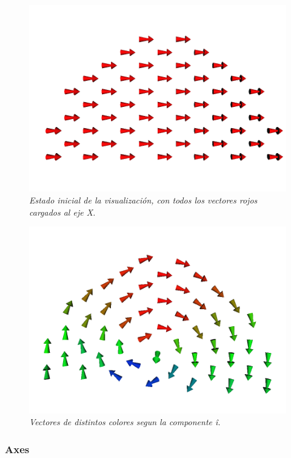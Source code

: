 \begin{figure}[H]
  \centering
  \includegraphics[scale=.3]{images/atomCanvas-vectores-inicial}
  \caption{\em Estado inicial de la visualización, con todos los vectores rojos cargados al eje X.}
\end{figure}

\begin{figure}[H]
  \centering
  \includegraphics[scale=.3]{images/atomCanvas-vectores-colores}
  \caption{\em Vectores de distintos colores segun la componente î.}
\end{figure}

\subsubsection{Axes}

